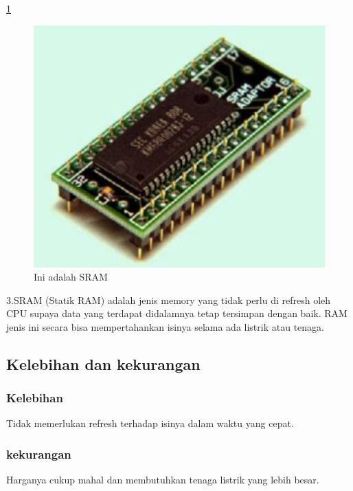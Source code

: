 \ref{SRAM}
  \begin{figure}[ht]
  \centerline{\includegraphics[width=1\textwidth]{figures/SRAM.jpg}}
  \caption{Ini adalah SRAM}
  \label{SRAM}
  \end{figure}
3.SRAM (Statik RAM) adalah jenis memory yang tidak perlu di refresh oleh CPU supaya data yang terdapat didalamnya tetap tersimpan dengan baik.
RAM jenis ini secara bisa mempertahankan isinya selama ada listrik atau tenaga.
  \subsection{Kelebihan dan kekurangan}
    \subsubsection{Kelebihan}
    \-Tidak memerlukan refresh terhadap isinya dalam waktu yang cepat.
    \subsubsection{kekurangan}
    \-Harganya cukup mahal dan membutuhkan tenaga listrik yang lebih besar.


